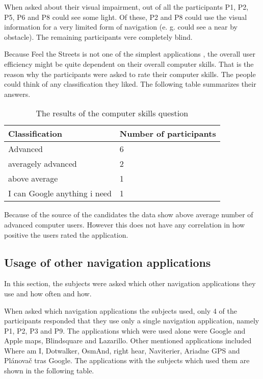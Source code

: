 \documentclass[nolof,digital]{fithesis3}
\begin{document}
When asked about their visual impairment, out of all the participants P1, P2, P5, P6 and P8 could see some light. Of these, P2 and P8 could use the visual information for a very limited form of navigation (e. g. could see a near by obstacle). The remaining participants vere completely blind.

Because Feel the Streets is not one of the simplest applications , the overall user efficiency might be quite dependent on their overall computer skills. That is the reason why the participants were asked to rate their computer skills. The people could think of any classification they liked. The following table summarizes their answers.
\begin{table}
\caption{The results of the computer skills question}
\begin{tabularx}{\textwidth}{ |X|X| }
Classification & Number of participants \\
\hline
Advanced & 6 \\
averagely advanced & 2 \\
above average & 1 \\
I can Google anything i need & 1 \\
\end{tabularx}
\end{table}
Because of the source of the candidates the data show above average number of advanced computer users. However this does not have any correlation in how positive the users rated the application.
\subsection{Usage of other navigation applications}
In this section, the subjects were asked which other navigation applications they use and how often and how.

When asked which navigation applications the subjects used, only 4 of the participants responded that they use only a single navigation application, namely P1, P2, P3 and P9. The applications which were used alone were Google and Apple maps, Blindsquare and Lazarillo. Other mentioned applications included Where am I, Dotwalker, OsmAnd, right hear, Naviterier, Ariadne GPS and Plánovač tras Google. The applications with the subjects which used them are shown in the following table.
\end{document}
